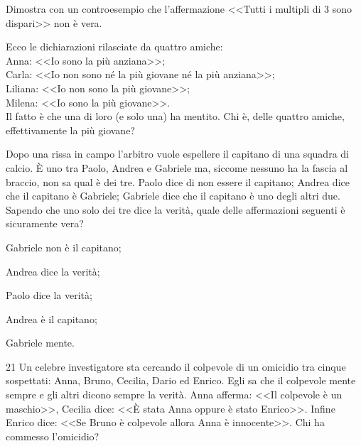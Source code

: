 \begin{esercizio}
\label{ese:0.18}
Dimostra con un controesempio che l'affermazione <<Tutti i multipli di 3 sono dispari>> non è vera.
\end{esercizio}

\begin{esercizio}
\label{ese:0.19}
Ecco le dichiarazioni rilasciate da quattro amiche:\\
Anna: <<Io sono la più anziana>>;\\
Carla: <<Io non sono né la più giovane né la più anziana>>;\\
Liliana: <<Io non sono la più giovane>>;\\
Milena: <<Io sono la più giovane>>.\\
Il fatto è che una di loro (e solo una) ha mentito. Chi è, delle quattro amiche, effettivamente la più giovane?
\end{esercizio}

\begin{esercizio}
\label{ese:0.20}
Dopo una rissa in campo l'arbitro vuole espellere il capitano di una squadra di calcio. \`E uno tra Paolo, Andrea e Gabriele ma, siccome nessuno ha la fascia al braccio, non sa qual è dei tre. Paolo dice di non essere il capitano; Andrea dice che il capitano è Gabriele; Gabriele dice che il capitano è uno degli altri due. Sapendo che uno solo dei tre dice la verità, quale delle affermazioni seguenti è sicuramente vera?
\begin{enumeratea}
\item Gabriele non è il capitano;
\item Andrea dice la verità;
\item Paolo dice la verità;
\item Andrea è il capitano;
\item Gabriele mente.
\end{enumeratea}
\end{esercizio}

\begin{esercizio}
\label{ese:0.21}
 21   Un celebre investigatore sta cercando il colpevole di un omicidio tra cinque sospettati: Anna, Bruno, Cecilia, Dario ed Enrico. Egli sa che il colpevole mente sempre e gli altri dicono sempre la verità. Anna afferma: <<Il colpevole è un maschio>>, Cecilia dice: <<\`E stata Anna oppure è stato Enrico>>. Infine Enrico dice: <<Se Bruno è colpevole allora Anna è innocente>>. Chi ha commesso l'omicidio?
\end{esercizio}

